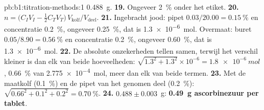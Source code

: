 \begin{solution}{pb:b1:titration-methods:1}
\qty{0.488}{g}.
\textbf{19.} Ongeveer \qty{2}{\percent} onder het etiket.
\textbf{20.} $n = \bigl(C_IV_I - \frac12C_TV_T\bigr)\,V_{\mathrm{kolf}}/V_{\mathrm{deel}}$.
\textbf{21.} Ingebracht jood: pipet $0.03/20.00 = \qty{0.15}{\percent}$
en concentratie \qty{0.2}{\percent}, ongeveer \qty{0.25}{\percent}, dat
is \qty{1.3e-6}{mol}. Overmaat: buret $0.05/8.90 = \qty{0.56}{\percent}$
en concentratie \qty{0.2}{\percent}, ongeveer \qty{0.60}{\percent}, dat
is \qty{1.3e-6}{mol}.
\textbf{22.} De absolute onzekerheden tellen samen, terwijl het verschil
kleiner is dan elk van beide hoeveelheden: $\sqrt{1.3^2 + 1.3^2} \times 10^{-6} =
\qty{1.8e-6}{mol}$, \qty{0.66}{\percent} van \qty{2.775e-4}{mol}, meer
dan elk van beide termen.
\textbf{23.} Met de maatkolf (\qty{0.1}{\percent}) en de pipet van het
genomen deel (\qty{0.2}{\percent}):
$\sqrt{0.66^2 + 0.1^2 + 0.2^2} = \qty{0.70}{\percent}$.
\textbf{24.} $0.488 \pm 0.003$~g: \textbf{\qty{0.49}{g} ascorbinezuur
per tablet}.
\end{solution}
